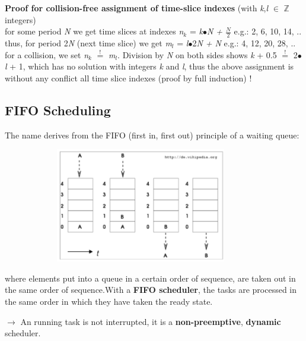 \textbf{Proof for collision-free assignment of time-slice indexes } (with \textit{k},\textit{l} $\in$ \textbf{$\boldsymbol{\mathbb{Z}}$}  integers)\\

for some period \textit{N} we get time slices at indexes  \textit{n${}_{k}$}  =  \textit{k$\bullet$N  +  $\frac{N}{2} $}  e.g.: 2, 6, 10, 14, ..\\

thus, for period 2\textit{N} (next time slice) we get    \textit{m${}_{l}$} =  \textit{l$\bullet$}2\textit{N  +  N  }e.g.: 4, 12, 20, 28, ..\\

for a collision, we set \textit{n${}_{k}$} ${\mathop{=}\limits^{!}} $ \textit{m${}_{l}$}. Division by \textit{N} on both sides shows \textit{k} + 0.5 ${\mathop{=}\limits^{!}} $ 2$\mathrm{\bullet}$\textit{l} + 1, which has no solution with integers \textit{k} and \textit{l}, thus the above assignment is without any conflict all time slice indexes (proof by full induction) !


\subsection{FIFO Scheduling}

The name derives from the FIFO (first in, first out) principle of a waiting queue:    

 	\begin{figure}[h]
    \centering
    \includegraphics[width=10cm, height=5cm]{Images/image97.png}
    \label{fig:Fig }
    \end{figure}
\newpage
where elements put into a queue in a certain order of sequence, are taken out in the same order of sequence.With a \textbf{FIFO scheduler}, the tasks are processed in the same order in which they have taken the ready state.  

$\rightarrow$ An running task is not interrupted, it is a \textbf{non-preemptive}, \textbf{dynamic} scheduler.\\

